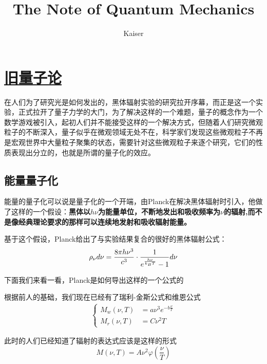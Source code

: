 \documentclass{article}
\title{The Note of Quantum Mechanics}
\author{Kaiser}
\begin{document}
\maketitle

\begin{center}
	\tableofcontents
\end{center}








\newpage




\section{\protect\hyperlink{:}{旧量子论}}



在人们为了研究光是如何发出的，黑体辐射实验的研究拉开序幕，而正是这一个实验，正式拉开了量子力学的大门，为了解决这样的一个难题，量子的概念作为一个数学游戏被引入，起初人们并不能接受这样的一个解决方式，但随着人们研究微观粒子的不断深入，量子似乎在微观领域无处不在，科学家们发现这些微观粒子不再是宏观世界中大量粒子聚集的状态，需要针对这些微观粒子来逐个研究，它们的性质表现出分立的，也就是所谓的量子化的效应。

\subsection{能量量子化}
能量的量子化可以说是量子化的一个开端，由Planck在解决黑体辐射时引入，他做了这样的一个假设：\textbf{黑体以}$h\nu$\textbf{为能量单位，不断地发出和吸收频率为}$\nu$\textbf{的辐射,而不是像经典理论要求的那样可以连续地发射和吸收辐射能量。}

基于这个假设，Planck给出了与实验结果复合的很好的黑体辐射公式：
\[\rho_\nu d\nu=\frac{8\pi h\nu^3}{c^3}\cdot \frac{1}{e^{\frac{h\nu}{k_{\tiny{B}}T}}-1}d\nu\]

下面我们来看一看，Planck是如何导出这样的一个公式的

根据前人的基础，我们现在已经有了瑞利-金斯公式和维恩公式
\begin{align*}
	\begin{cases}
		M_w(\nu,T) & =a\nu^3e^{-b\frac{\nu}{T}} \\
		M_r(\nu,T) & =C\nu^2T
	\end{cases}
\end{align*}

此时的人们已经知道了辐射的表达式应该是这样的形式
\[M(\nu,T)=A\nu^2\varphi(\frac{\nu}{T})\]
\end{document}
